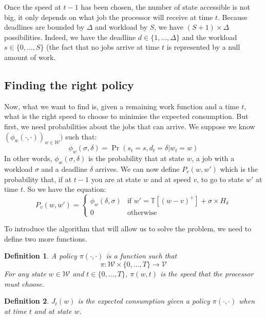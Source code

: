 \documentclass[
10pt, %
a4paper, %
oneside, %
headinclude,footinclude, %
BCOR5mm, %
]{scrartcl}
\newcommand{\V}{\mathcal{V}}
\newcommand{\T}{\mathbb{T}}
\newcommand{\W}{\mathcal{W}}
\newtheorem{defi}{Definition}
\begin{document}
Once the speed at $t-1$ has been chosen, the number of state
accessible is not big, it only depends on what job the processor will
receive at time $t$. Because deadlines are bounded by $\Delta$ and
workload by $S$, we have $(S+1)\times\Delta$ possibilities. Indeed, we
have the deadline $d\in\{1,\dots, \Delta\}$ and the workload
$s\in\{0,\dots, S\}$ (the fact that no jobs arrive at time $t$ is
represented by a null amount of work.

\subsection{Finding the right policy}
Now, what we want to find is, given a remaining work function and a
time $t$, what is the right speed to choose to minimise the expected
consumption. But first, we need probabilities about the jobs that can
arrive. We suppose we know $(\phi_w(\cdot,\cdot))_{w\in\W})$ such that:
\begin{equation}
  \label{eq:prob}
  \phi_w(\sigma, \delta)=\Pr(s_t=s,d_t=\delta|w_t=w)
\end{equation}
In other words, $\phi_w(\sigma,\delta)$ is the probability that at state
$w$, a job with a workload $\sigma$ and a deadline $\delta$
arrives. We can now define $P_v(w,w')$ which is the probability that,
if at $t-1$ you are at state $w$ and at speed $v$, to go to state $w'$
at time $t$. So we have the equation:
\begin{equation}
  \label{eq:wtowp}
  P_v(w,w')=
  \begin{cases}
    \phi_w(\delta,\sigma) & \mbox{if } w'=\T[(w-v)^+]+\sigma\times
    H_\delta\\
    0 & \mbox{otherwise}
  \end{cases}
\end{equation}


To introduce the algorithm that will allow us to solve the problem, we
need to define two more functions.

\begin{defi}
  A policy $\pi(\cdot,\cdot)$ is a function such that
  \[
    \pi:\W\times \{0,\dots,T\}\rightarrow\V
  \]
  For any state $w\in\W$ and $t\in\{0,\dots,T\}$, $\pi(w,t)$ is the
  speed that the processor must choose.
\end{defi}

\begin{defi}
  $J_t(w)$ is the expected consumption given a policy
  $\pi(\cdot,\cdot)$ when at time $t$ and at state $w$.
\end{defi}
\end{document}
